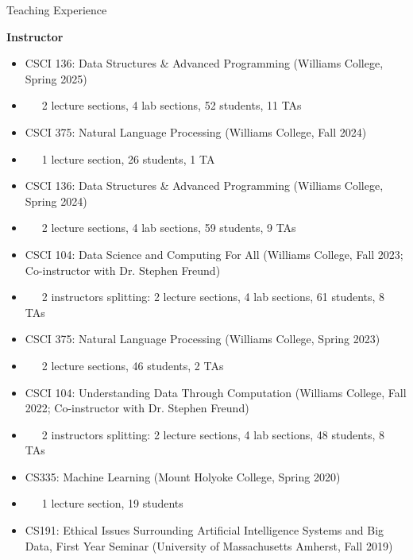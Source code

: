 \documentclass{resume} %
\begin{document}

\begin{rSection}{Teaching Experience}

\textbf{Instructor}

\begin{itemize}
    \item CSCI 136: Data Structures \& Advanced Programming (Williams College, Spring 2025)
    \item[] ~~~2 lecture sections, 4 lab sections, 52 students, 11 TAs

    \item CSCI 375: Natural Language Processing (Williams College, Fall 2024)
    \item[] ~~~1 lecture section, 26 students, 1 TA

    \item CSCI 136: Data Structures \& Advanced Programming (Williams College, Spring 2024)
    \item[] ~~~2 lecture sections, 4 lab sections, 59 students, 9 TAs

    \item CSCI 104: Data Science and Computing For All (Williams College, Fall 2023; Co-instructor with Dr. Stephen Freund)
    \item[] ~~~2 instructors splitting: 2 lecture sections, 4 lab sections, 61 students, 8 TAs

    \item CSCI 375: Natural Language Processing (Williams College, Spring 2023)
    \item[] ~~~2 lecture sections, 46 students, 2 TAs

    \item CSCI 104: Understanding Data Through Computation (Williams College, Fall 2022; Co-instructor with Dr. Stephen Freund)
    \item[] ~~~2 instructors splitting: 2 lecture sections, 4 lab sections, 48 students, 8 TAs

    \item CS335: Machine Learning (Mount Holyoke College, Spring 2020)
    \item[] ~~~1 lecture section, 19 students

    \item CS191: Ethical Issues Surrounding Artificial Intelligence Systems and Big Data, First Year Seminar (University of Massachusetts Amherst, Fall 2019)
\end{itemize}



\end{rSection}
\end{document}
